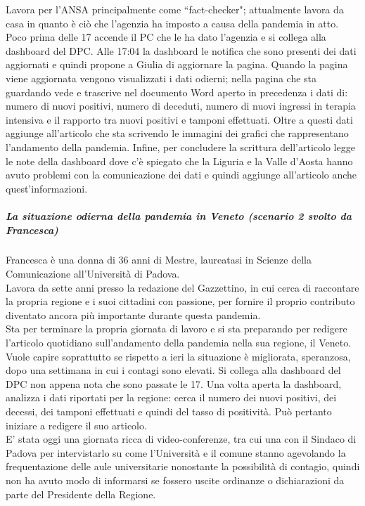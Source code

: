 Lavora per l'ANSA principalmente come ``fact-checker"; attualmente lavora da casa in quanto è ciò che l'agenzia ha imposto a causa della pandemia in atto.\\
Poco prima delle 17 accende il PC che le ha dato l'agenzia e si collega alla dashboard del DPC.
Alle 17:04 la dashboard le notifica che sono presenti dei dati aggiornati e quindi propone a Giulia di aggiornare la pagina.
Quando la pagina viene aggiornata vengono visualizzati i dati odierni; nella pagina che sta guardando vede e trascrive nel documento Word aperto in precedenza i dati di: numero di nuovi positivi, numero di deceduti, numero di nuovi ingressi in terapia intensiva e il rapporto tra nuovi positivi e tamponi effettuati.
Oltre a questi dati aggiunge all'articolo che sta scrivendo le immagini dei grafici che rappresentano l'andamento della pandemia.
Infine, per concludere la scrittura dell'articolo legge le note della dashboard dove c'è spiegato che la Liguria e la Valle d'Aosta hanno avuto problemi con la comunicazione dei dati e quindi aggiunge all'articolo anche quest'informazioni.
\noindent
\subparagraph{La situazione odierna della pandemia in Veneto (scenario 2 svolto da Francesca)}
Francesca è una donna di 36 anni di Mestre, laureatasi in Scienze della Comunicazione all'Università di Padova.\\
Lavora da sette anni presso la redazione del Gazzettino, in cui cerca di raccontare la propria regione e i suoi cittadini con passione, per fornire il proprio contributo diventato ancora più importante durante questa pandemia.\\
Sta per terminare la propria giornata di lavoro e si sta preparando per redigere l'articolo quotidiano sull'andamento della pandemia nella sua regione, il Veneto.\\
Vuole capire soprattutto se rispetto a ieri la situazione è migliorata, speranzosa, dopo una settimana in cui i contagi sono elevati. Si collega alla dashboard del DPC non appena nota che sono passate le 17.
Una volta aperta la dashboard, analizza i dati riportati per la regione: cerca il numero dei nuovi positivi, dei decessi, dei tamponi effettuati e quindi del tasso di positività. Può pertanto iniziare a redigere il suo articolo.\\
E' stata oggi una giornata ricca di video-conferenze, tra cui una con il Sindaco di Padova per intervistarlo su come l'Università e il comune stanno agevolando la frequentazione delle aule universitarie nonostante la possibilità di contagio, quindi non ha avuto modo di informarsi se fossero uscite ordinanze o dichiarazioni da parte del Presidente della Regione.
